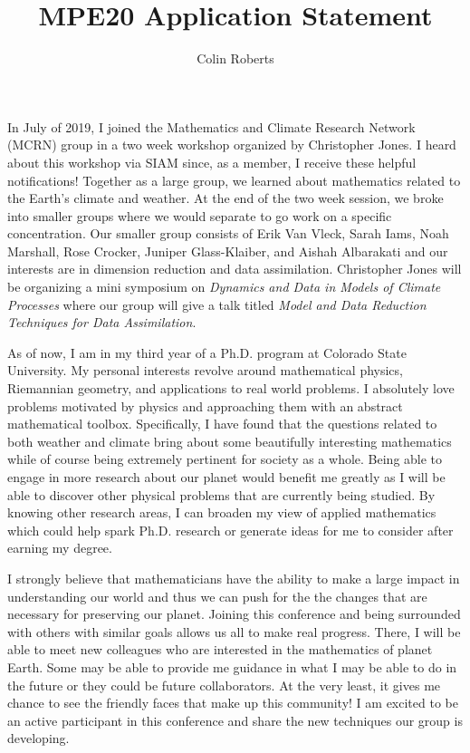 \documentclass{article}
\title{MPE20 Application Statement}
\author{Colin Roberts}
\date{}
\begin{document}
\maketitle

In July of 2019, I joined the Mathematics and Climate Research Network (MCRN) group in a two week workshop organized by Christopher Jones. I heard about this workshop via SIAM since, as a member, I receive these helpful notifications! Together as a large group, we learned about mathematics related to the Earth's climate and weather.  At the end of the two week session, we broke into smaller groups where we would separate to go work on a specific concentration.  Our smaller group consists of Erik Van Vleck, Sarah Iams, Noah Marshall, Rose Crocker, Juniper Glass-Klaiber, and Aishah Albarakati and our interests are in dimension reduction and data assimilation. Christopher Jones will be organizing a mini symposium on \emph{Dynamics and Data in Models of Climate Processes} where our group will give a talk titled \emph{Model and Data Reduction Techniques for Data Assimilation}.

As of now, I am in my third year of a Ph.D. program at Colorado State University.  My personal interests revolve around mathematical physics, Riemannian geometry, and applications to real world problems. I absolutely love problems motivated by physics and approaching them with an abstract mathematical toolbox. Specifically, I have found that the questions related to both weather and climate bring about some beautifully interesting mathematics while of course being extremely pertinent for society as a whole.  Being able to engage in more research about our planet would benefit me greatly as I will be able to discover other physical problems that are currently being studied. By knowing other research areas, I can broaden my view of applied mathematics which could help spark Ph.D. research or generate ideas for me to consider after earning my degree.

I strongly believe that mathematicians have the ability to make a large impact in understanding our world and thus we can push for the the changes that are necessary for preserving our planet.  Joining this conference and being surrounded with others with similar goals allows us all to make real progress.  There, I will be able to meet new colleagues who are interested in the mathematics of planet Earth.  Some may be able to provide me guidance in what I may be able to do in the future or they could be future collaborators.  At the very least, it gives me chance to see the friendly faces that make up this community! I am excited to be an active participant in this conference and share the new techniques our group is developing.
\end{document}
